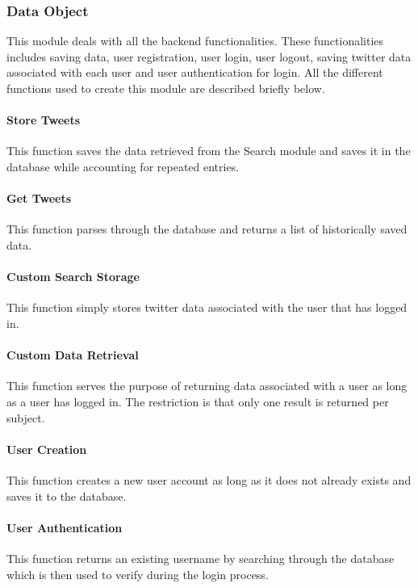 \documentclass[12pt, titlepage]{article}
\begin{document}
\subsubsection{Data Object}
This module deals with all the backend functionalities. These functionalities includes saving data, user registration, user login, user logout, saving twitter data associated with each user and user authentication for login. All the different functions used to create this module are described briefly below.

\paragraph{Store Tweets}
This function saves the data retrieved from the Search module and saves it in the database while accounting for repeated entries.

\paragraph{Get Tweets}
This function parses through the database and returns a list of historically saved data.

\paragraph{Custom Search Storage}
This function simply stores twitter data associated with the user that has logged in. 

\paragraph{Custom Data Retrieval}
This function serves the purpose of returning data associated with a user as long as a user has logged in. The restriction is that only one result is returned per subject. 

\paragraph{User Creation}
This function creates a new user account as long as it does not already exists and saves it to the database.

\paragraph{User Authentication}
This function returns an existing username by searching through the database which is then used to verify during the login process. 
\end{document}
